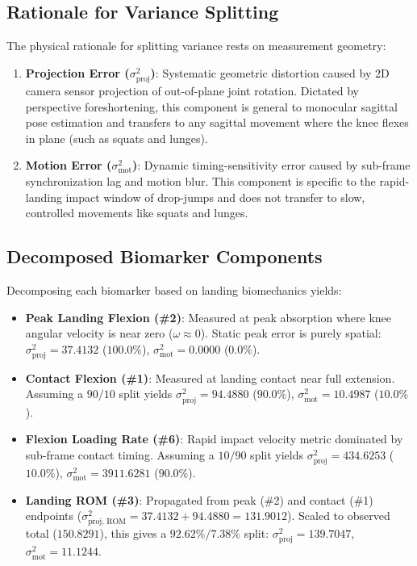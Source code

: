 \subsection{Rationale for Variance Splitting}
\label{sec:8-3-1-rationale-for-variance-splitting}

The physical rationale for splitting variance rests on measurement geometry:
\begin{enumerate}
  \item \textbf{Projection Error ($\sigma^2_{\text{proj}}$)}: Systematic geometric distortion caused by 2D camera sensor projection of out-of-plane joint rotation. Dictated by perspective foreshortening, this component is general to monocular sagittal pose estimation and transfers to any sagittal movement where the knee flexes in plane (such as squats and lunges).
  \item \textbf{Motion Error ($\sigma^2_{\text{mot}}$)}: Dynamic timing-sensitivity error caused by sub-frame synchronization lag and motion blur. This component is specific to the rapid-landing impact window of drop-jumps and does not transfer to slow, controlled movements like squats and lunges.
\end{enumerate}

\subsection{Decomposed Biomarker Components}
\label{sec:8-3-2-decomposed-biomarker-components}

Decomposing each biomarker based on landing biomechanics yields:
\begin{itemize}
  \item \textbf{Peak Landing Flexion (\protect\#2)}: Measured at peak absorption where knee angular velocity is near zero ($\omega \approx 0$). Static peak error is purely spatial: $\sigma^2_{\text{proj}} = \mathbf{37.4132}$ ($100.0\%$), $\sigma^2_{\text{mot}} = \mathbf{0.0000}$ ($0.0\%$).
  \item \textbf{Contact Flexion (\protect\#1)}: Measured at landing contact near full extension. Assuming a $90/10$ split yields $\sigma^2_{\text{proj}} = \mathbf{94.4880}$ ($90.0\%$), $\sigma^2_{\text{mot}} = \mathbf{10.4987}$ ($10.0\%$).
  \item \textbf{Flexion Loading Rate (\protect\#6)}: Rapid impact velocity metric dominated by sub-frame contact timing. Assuming a $10/90$ split yields $\sigma^2_{\text{proj}} = \mathbf{434.6253}$ ($10.0\%$), $\sigma^2_{\text{mot}} = \mathbf{3911.6281}$ ($90.0\%$).
  \item \textbf{Landing ROM (\protect\#3)}: Propagated from peak (\protect\#2) and contact (\protect\#1) endpoints ($\sigma^2_{\text{proj, ROM}} = 37.4132 + 94.4880 = 131.9012$). Scaled to observed total ($150.8291$), this gives a $92.62\% / 7.38\%$ split: $\sigma^2_{\text{proj}} = \mathbf{139.7047}$, $\sigma^2_{\text{mot}} = \mathbf{11.1244}$.
\end{itemize}

